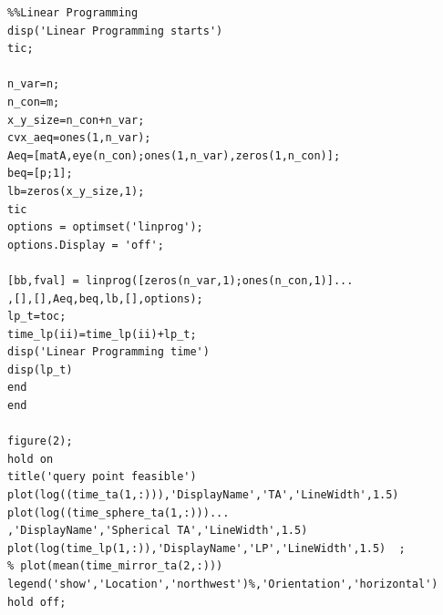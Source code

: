 \documentclass[a4paper,12pt]{article}
\begin{document}
\begin{verbatim}
%%Linear Programming
disp('Linear Programming starts')
tic;

n_var=n;
n_con=m;
x_y_size=n_con+n_var;
cvx_aeq=ones(1,n_var);
Aeq=[matA,eye(n_con);ones(1,n_var),zeros(1,n_con)];
beq=[p;1];
lb=zeros(x_y_size,1);
tic
options = optimset('linprog');
options.Display = 'off';

[bb,fval] = linprog([zeros(n_var,1);ones(n_con,1)]...
,[],[],Aeq,beq,lb,[],options);
lp_t=toc;
time_lp(ii)=time_lp(ii)+lp_t;
disp('Linear Programming time')
disp(lp_t)
end  
end

figure(2);
hold on
title('query point feasible')
plot(log((time_ta(1,:))),'DisplayName','TA','LineWidth',1.5)
plot(log((time_sphere_ta(1,:)))...
,'DisplayName','Spherical TA','LineWidth',1.5)  
plot(log(time_lp(1,:)),'DisplayName','LP','LineWidth',1.5)  ;
% plot(mean(time_mirror_ta(2,:)))  
legend('show','Location','northwest')%,'Orientation','horizontal')
hold off;
\end{verbatim}
\end{document}
